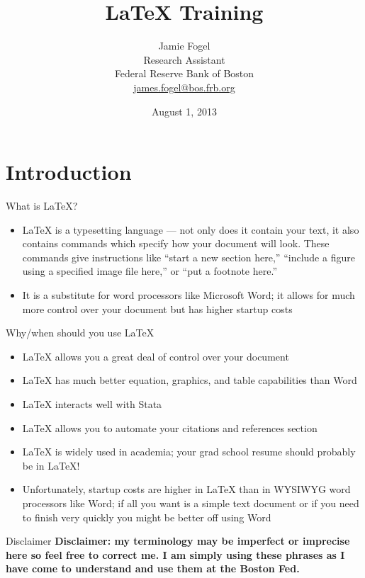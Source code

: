 \documentclass[fleqn, 10pt]{beamer}
\title{\LaTeX{} Training}
\author[J. Fogel]{Jamie Fogel \\
        Research Assistant \\
        Federal Reserve Bank of Boston \\
        \href{mailto:james.fogel@bos.frb.org}{james.fogel@bos.frb.org}
        }
\date[August 2013]{August 1, 2013}
\begin{document}
\begin{frame}[plain]
    \titlepage
\end{frame}

\section{Introduction}

\begin{frame}{What is \LaTeX{}?}
    \begin{itemize}
        \item\LaTeX{} is a typesetting language --- not only does it contain your text, it also contains commands which specify how your document will look. These commands give instructions like ``start a new section here,'' ``include a figure using a specified image file here,'' or ``put a footnote here.''
        \item It is a substitute for word processors like Microsoft Word; it allows for much more control over your document but has higher startup costs
    \end{itemize}
\end{frame}

\begin{frame}{Why/when should you use \LaTeX{}}
    \begin{itemize}
        \item \LaTeX{} allows you a great deal of control over your document \pause
        \item \LaTeX{} has much better equation, graphics, and table capabilities than Word \pause
        \item \LaTeX{} interacts well with Stata \pause
        \item \LaTeX{} allows you to automate your citations and references section \pause
        \item \LaTeX{} is widely used in academia; your grad school resume should probably be in \LaTeX{}! \pause
        \item Unfortunately, startup costs are higher in \LaTeX{} than in WYSIWYG word processors like Word; if all you want is a simple text document or if you need to finish very quickly you might be better off using Word
    \end{itemize}
\end{frame}


\begin{frame}{Disclaimer}
    \textbf{Disclaimer: my terminology may be imperfect or imprecise here so feel free to correct me. I am simply using these phrases as I have come to understand and use them at the Boston Fed.}
\end{frame}
\end{document}
